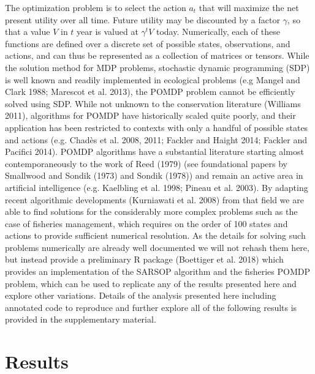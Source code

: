 \documentclass[3p]{elsarticle} %
\begin{document}
The optimization problem is to select the action \(a_t\) that will
maximize the net present utility over all time. Future utility may be
discounted by a factor \(\gamma\), so that a value \(V\) in \(t\) year
is valued at \(\gamma^t V\) today. Numerically, each of these functions
are defined over a discrete set of possible states, observations, and
actions, and can thus be represented as a collection of matrices or
tensors. While the solution method for MDP problems, stochastic dynamic
programming (SDP) is well known and readily implemented in ecological
problems (e.g Mangel and Clark 1988; Marescot et al. 2013), the POMDP
problem cannot be efficiently solved using SDP. While not unknown to the
conservation literature (Williams 2011), algorithms for POMDP have
historically scaled quite poorly, and their application has been
restricted to contexts with only a handful of possible states and
actions (e.g. Chadès et al. 2008, 2011; Fackler and Haight 2014; Fackler
and Pacifici 2014). POMDP algorithms have a substantial literature
starting almost contemporaneously to the work of Reed (1979) (see
foundational papers by Smallwood and Sondik (1973) and Sondik (1978))
and remain an active area in artificial intelligence (e.g. Kaelbling et
al. 1998; Pineau et al. 2003). By adapting recent algorithmic
developments (Kurniawati et al. 2008) from that field we are able to
find solutions for the considerably more complex problems such as the
case of fisheries management, which requires on the order of 100 states
and actions to provide sufficient numerical resolution. As the details
for solving such problems numerically are already well documented we
will not rehash them here, but instead provide a preliminary R package
(Boettiger et al. 2018) which provides an implementation of the SARSOP
algorithm and the fisheries POMDP problem, which can be used to
replicate any of the results presented here and explore other
variations. Details of the analysis presented here including annotated
code to reproduce and further explore all of the following results is
provided in the supplementary material.

\section{Results}\label{results}
\end{document}
